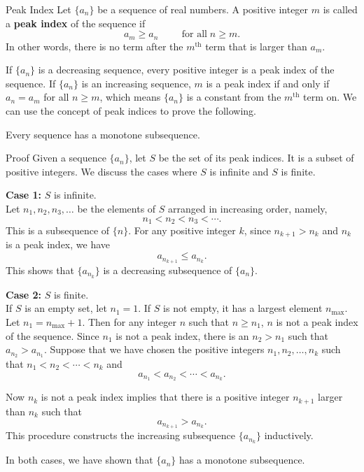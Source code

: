  \begin{definition}{Peak Index}
 Let $\{a_n\}$ be a sequence of real numbers. A positive integer $m$ is called a {\bf peak index} of the sequence if 
 \[a_m\geq a_n\hspace{1cm}\text{for all}\;n\geq m.\]In other words,   there is no term after the $m^{\text{th}}$ term that is larger than $a_m$.
 \end{definition}
 
 If $\{a_n\}$ is a decreasing sequence, every positive integer is a peak index of the sequence. If $\{a_n\}$ is an increasing sequence, $m$ is a peak index if and only if $a_n=a_m$ for all $n\geq m$, which means $\{a_n\}$ is a constant from the $m^{\text{th}}$ term on. We can use the concept of peak indices to prove the following.
 
 \begin{theorem}{}
 Every sequence has a monotone subsequence.
 \end{theorem}
 \begin{myproof}{Proof}
 Given a sequence $\{a_n\}$, let $S$ be the set of its peak indices. It is a subset of positive integers.  We discuss the cases where $S$ is infinite and $S$ is finite.
 
 \textbf{Case 1:} $S$ is infinite.\\
Let
 $n_1, n_2, n_3, \ldots$ be the elements of $S$  arranged in increasing order, namely,
 \[n_1<n_2<n_3<\cdots.\] This is a subsequence of $\{n\}$. For any positive integer $k$, since $n_{k+1}>n_k$ and $n_k$ is a peak index, we have
 \[a_{n_{k+1}}\leq a_{n_k}.\]
 This shows that $\{a_{n_k}\}$ is a decreasing subsequence of $\{a_n\}$.
 
 \textbf{Case 2:} $S$ is finite.\\If $S$ is an empty set, let $n_1=1$. If $S$ is not empty,   it has a largest element $n_{\max}$. Let $n_1=n_{\max}+1$. Then for any integer $n$ such that $n\geq n_1$, $n$ is not a peak index of the sequence. Since  $n_1$ is not a peak index, there is an $n_2>n_1$ such that
$a_{n_2}>a_{n_1}$.
 Suppose that we have chosen the positive integers $n_1, n_2, \ldots, n_k$ such that $n_1<n_2<\cdots<n_k$ and
 \[a_{n_1}<a_{n_2}<\cdots<a_{n_k}.\]

 Now $n_k$ is   not a peak index implies that there is a positive integer $n_{k+1}$ larger than $n_k$ such that
 \[a_{n_{k+1}}>a_{n_{k}}.\] 
 This procedure constructs the increasing subsequence $\{a_{n_k}\}$ inductively.
 
 In both cases, we have shown that $\{a_n\}$ has a monotone subsequence.
 \end{myproof}
 
